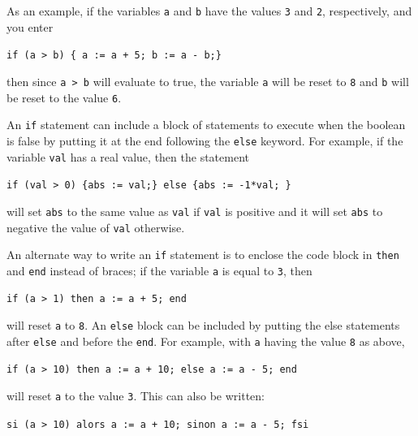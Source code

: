 \documentclass[a4paper,11pt]{book}
\begin{document}
As an example, if the variables \texttt{a} and \texttt{b} have the
values \texttt{3} and \texttt{2}, respectively, and you enter
\begin{center}
  {\tt if (a > b) \{ a := a + 5; b := a - b;\}}
\end{center}
then since \texttt{a > b} will evaluate to true, the variable
\texttt{a} will be reset to \texttt{8} and \texttt{b} will be reset
to the value \texttt{6}. 

An \texttt{if} statement can include a block of statements to execute
when the boolean is false by putting it at the end following the
\texttt{else} keyword.  For example, if the variable
\texttt{val} has a real value, then the statement
\begin{center}
  {\tt if (val > 0) \{abs := val;\} else \{abs := -1*val; \} }
\end{center}
will set \texttt{abs} to the same value as \texttt{val} if
\texttt{val} is positive and it will set \texttt{abs} to negative the
value of \texttt{val} otherwise.

An alternate way to write an \texttt{if} statement is to
enclose the code block in \texttt{then} and
\texttt{end} instead of braces;  if the variable \texttt{a}
is equal to \texttt{3}, then 
\begin{center}
  {\tt if (a > 1) then a := a + 5; end}
\end{center}
will reset \texttt{a} to \texttt{8}.  
An \texttt{else} block can be included by putting the else statements
after \texttt{else} and before the \texttt{end}.  For example, with
\texttt{a} having the value \texttt{8} as above, 
\begin{center}
  {\tt if (a > 10) then a := a + 10; else a := a - 5; end}
\end{center}
will reset \texttt{a} to the value \texttt{3}.  
This
can also be written:
\begin{center}
  {\tt si (a > 10) alors a := a + 10; sinon a := a - 5; fsi}
\end{center}
\end{document}
